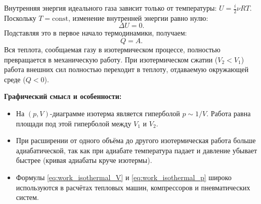 \begin{property}
Внутренняя энергия идеального газа зависит только от температуры: $U = \frac{i}{2} \nu R T$. Поскольку $T = \text{const}$, изменение внутренней энергии равно нулю:
\begin{equation}
    \Delta U = 0.
\end{equation}
Подставляя это в первое начало термодинамики, получаем:
\begin{equation}
    Q = A. \label{eq:first_law_iso}
\end{equation}
Вся теплота, сообщаемая газу в изотермическом процессе, полностью превращается в механическую работу. При изотермическом сжатии ($V_2 < V_1$) работа внешних сил полностью переходит в теплоту, отдаваемую окружающей среде ($Q < 0$).
\end{property}

\begin{remark}
\textbf{Графический смысл и особенности:}
\begin{itemize}
    \item На $(p, V)$-диаграмме изотерма является гиперболой $p \sim 1/V$. Работа равна площади под этой гиперболой между $V_1$ и $V_2$.
    \item При расширении от одного объёма до другого изотермическая работа больше адиабатической, так как при адиабате температура падает и давление убывает быстрее (кривая адиабаты круче изотермы).
    \item Формулы \eqref{eq:work_isothermal_V} и \eqref{eq:work_isothermal_p} широко используются в расчётах тепловых машин, компрессоров и пневматических систем.
\end{itemize}
\end{remark}

